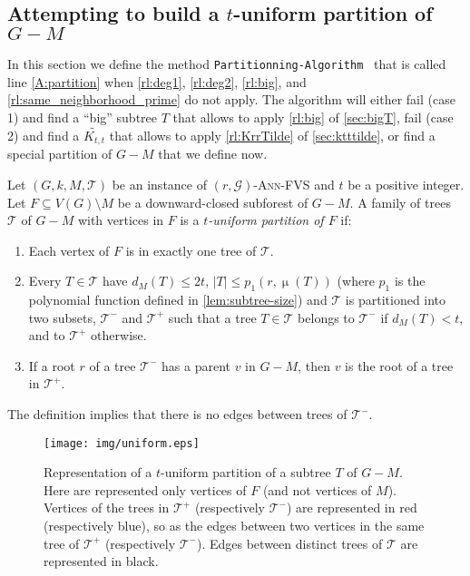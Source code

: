 \documentclass{amsart}
\newcommand{\algopart }{\texttt{Partitionning-Algorithm}~ }
\newcommand{\G}{\mathcal{G}}
\newcommand{\mT}{\mathcal{T}}
\newcommand{\KttTilde}{\widetilde{K_{t,t}}}
\DeclareMathOperator\db{\mu}
\newcommand{\AFVS}{\textsc{$(r,\G)$-Ann-FVS}\xspace}
\newcommand{\ruleref}[1]{\hyperref[#1]{\ref*{#1}}}
\begin{document}
\subsection{Attempting to build a \texorpdfstring{$t$}{t}-uniform partition of  \texorpdfstring{$G-M$}{G-M}}
\label{sssec:partition-algo}
In this section we define the method \algopart that is called line \ref{A:partition} when \ruleref{rl:deg1}, \ruleref{rl:deg2}, \ruleref{rl:big}, and \ruleref{rl:same_neighborhood_prime} do not apply.
The algorithm will either fail (case 1) and find a ``big'' subtree $T$ that allows to apply \ruleref{rl:big} of \autoref{sec:bigT}, fail (case 2) and find a $\KttTilde$ that allows to apply \ruleref{rl:KrrTilde} of \autoref{sec:ktttilde}, or find a special partition of $G-M$ that we define now.



\begin{definition}\label{def:unif}
Let $(G,k,M,\mT)$ be an instance of \AFVS and $t$ be a positive integer.  Let $F \subseteq V(G)\setminus M$ be a downward-closed subforest of $G-M$. A family of trees $\mT$ of $G-M$ with vertices in $F$ is a \emph{$t$-uniform partition of $F$} if:
    \begin{enumerate}
    \item \label{item:unif1} Each vertex of $F$ is in exactly one tree of $\mT$.
    \item \label{item:unif2}Every $T\in \mT$ have $d_M(T)\le 2t$, $|T|\leq p_1(r,\db(T))$ (where $p_1$ is the polynomial function defined in \autoref{lem:subtree-size}) and $\mT$ is partitioned into two subsets, $\mT^-$ and $\mT^+$ such that a tree $T\in \mT$ belongs to $\mT^-$ if $d_M(T)<t$, and to $\mT^+$ otherwise.
    \item \label{item:unif3} If a root $r$ of a tree $\mT^-$ has a parent $v$ in $G-M$, then $v$ is the root of a tree in $\mT^+$.
\end{enumerate}
\end{definition}
\begin{remark}
The definition implies that there is no edges between trees of $\mT^-$.
\end{remark}
\begin{figure}
    \centering
    \texttt{[image: img/uniform.eps]}
    \caption{Representation of a $t$-uniform partition of a subtree $T$ of $G-M$. Here are represented only vertices of $F$ (and not vertices of $M$). Vertices of the trees in $\mT^+$ (respectively $\mT^-$) are represented in red (respectively blue), so as the edges between two vertices in the same tree of $\mT^+$ (respectively $\mT^-$). Edges between distinct trees of $\mT$ are represented in black. }
    \label{fig:uniform}
\end{figure}
\end{document}
